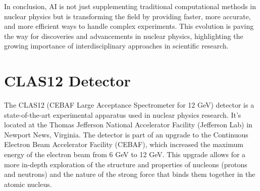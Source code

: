 \documentclass[preprint,12pt]{elsarticle}
\begin{document}
In conclusion, AI is not just supplementing traditional computational methods in nuclear physics but is transforming the field by providing faster, more accurate, and more efficient ways to handle complex experiments. This evolution is paving the way for discoveries and advancements in nuclear physics, highlighting the growing importance of interdisciplinary approaches in scientific research.

\section{CLAS12 Detector}

The CLAS12 (CEBAF Large Acceptance Spectrometer for 12 GeV) detector is a state-of-the-art experimental apparatus used in nuclear physics research. It's located at the Thomas Jefferson National Accelerator Facility (Jefferson Lab) in Newport News, Virginia. The detector is part of an upgrade to the Continuous Electron Beam Accelerator Facility (CEBAF), which increased the maximum energy of the electron beam from 6 GeV to 12 GeV. This upgrade allows for a more in-depth exploration of the structure and properties of nucleons (protons and neutrons) and the nature of the strong force that binds them together in the atomic nucleus.
\end{document}
